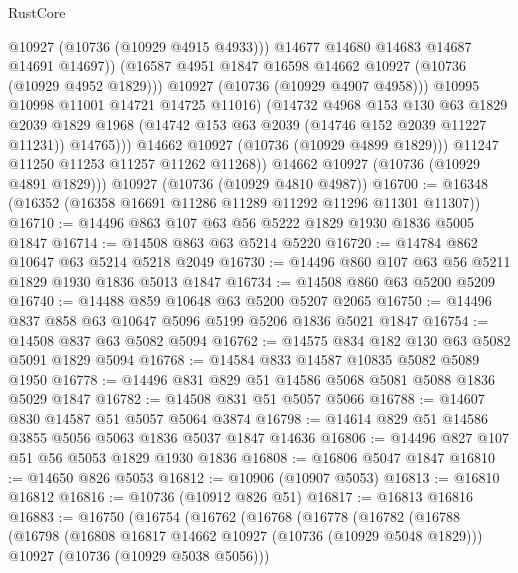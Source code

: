 \begin{lexlean}{RustCore}
\begin{coremodule}
                          @10927
                          (@10736 (@10929 @4915 @4933)))
                        @14677
                        @14680
                        @14683
                        @14687
                        @14691
                        @14697))
                    (@16587 @4951 @1847 @16598 @14662 @10927 (@10736 (@10929 @4952 @1829)))
                    @10927
                    (@10736 (@10929 @4907 @4958)))
                  @10995
                  @10998
                  @11001
                  @14721
                  @14725
                  @11016)
                (@14732
                  @4968
                  @153
                  @130
                  @63
                  @1829
                  @2039
                  @1829
                  @1968
                  (@14742 @153 @63 @2039 (@14746 @152 @2039 @11227 @11231))
                  @14765)))
            @14662
            @10927
            (@10736 (@10929 @4899 @1829)))
          @11247
          @11250
          @11253
          @11257
          @11262
          @11268))
      @14662
      @10927
      (@10736 (@10929 @4891 @1829)))
    @10927
    (@10736 (@10929 @4810 @4987))
@16700 := @16348 (@16352 (@16358 @16691 @11286 @11289 @11292 @11296 @11301 @11307))
@16710 := @14496 @863 @107 @63 @56 @5222 @1829 @1930 @1836 @5005 @1847
@16714 := @14508 @863 @63 @5214 @5220
@16720 := @14784 @862 @10647 @63 @5214 @5218 @2049
@16730 := @14496 @860 @107 @63 @56 @5211 @1829 @1930 @1836 @5013 @1847
@16734 := @14508 @860 @63 @5200 @5209
@16740 := @14488 @859 @10648 @63 @5200 @5207 @2065
@16750 := @14496 @837 @858 @63 @10647 @5096 @5199 @5206 @1836 @5021 @1847
@16754 := @14508 @837 @63 @5082 @5094
@16762 := @14575 @834 @182 @130 @63 @5082 @5091 @1829 @5094
@16768 := @14584 @833 @14587 @10835 @5082 @5089 @1950
@16778 := @14496 @831 @829 @51 @14586 @5068 @5081 @5088 @1836 @5029 @1847
@16782 := @14508 @831 @51 @5057 @5066
@16788 := @14607 @830 @14587 @51 @5057 @5064 @3874
@16798 := @14614 @829 @51 @14586 @3855 @5056 @5063 @1836 @5037 @1847 @14636
@16806 := @14496 @827 @107 @51 @56 @5053 @1829 @1930 @1836
@16808 := @16806 @5047 @1847
@16810 := @14650 @826 @5053
@16812 := @10906 (@10907 @5053)
@16813 := @16810 @16812
@16816 := @10736 (@10912 @826 @51)
@16817 := @16813 @16816
@16883 := @16750
    (@16754
      (@16762
        (@16768
          (@16778
            (@16782
              (@16788
                (@16798
                  (@16808 @16817 @14662 @10927 (@10736 (@10929 @5048 @1829)))
                  @10927
                  (@10736 (@10929 @5038 @5056)))

\end{coremodule}
\end{lexlean}
